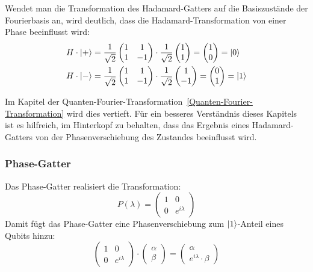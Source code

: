 Wendet man die Transformation des Hadamard-Gatters auf die Basiszustände der Fourierbasis an, 
wird deutlich,
dass die Hadamard-Transformation von einer Phase beeinflusst wird:
\begin{align*}
  H \cdot \ket{+} &=
  \frac{1}{\sqrt{2}}
  \begin{pmatrix}
    1 & 1 \\
    1 & -1
  \end{pmatrix}
  \cdot
  \frac{1}{\sqrt{2}}
  \begin{pmatrix}
    1 \\
    1
  \end{pmatrix}
  =
  \begin{pmatrix}
    1 \\
    0
  \end{pmatrix}
  =
  \ket{0}\\
  H \cdot \ket{-} &=
  \frac{1}{\sqrt{2}}
  \begin{pmatrix}
    1 & 1 \\
    1 & -1
  \end{pmatrix}
  \cdot
  \frac{1}{\sqrt{2}}
  \begin{pmatrix}
    1 \\
    -1
  \end{pmatrix}
  =
  \begin{pmatrix}
    0 \\
    1
  \end{pmatrix}
  =
  \ket{1}
\end{align*}


    Im Kapitel der Quanten-Fourier-Transformation~\ref{Quanten-Fourier-Transformation} wird dies vertieft.
    Für ein besseres Verständnis dieses Kapitels ist es hilfreich, 
    im Hinterkopf zu behalten, 
    dass das Ergebnis eines Hadamard-Gatters von der Phasenverschiebung des Zustandes beeinflusst wird.

    \vspace{1em}

    \subsubsection*{Phase-Gatter}
    Das Phase-Gatter realisiert die Transformation:
    \[
      P(\lambda) =
      \begin{pmatrix}
        1 & 0 \\
        0 & e^{i\lambda}
        \end{pmatrix}
      \]
    Damit fügt das Phase-Gatter eine Phasenverschiebung zum \(\ket{1}\)-Anteil eines Qubits hinzu:
    \[
      \begin{pmatrix}
        1 & 0 \\
        0 & e^{i\lambda}
        \end{pmatrix}
        \cdot
        \begin{pmatrix}
          \alpha \\
          \beta
        \end{pmatrix}
          =
        \begin{pmatrix}
          \alpha \\
          e^{i\lambda} \cdot \beta
        \end{pmatrix}
    \]

